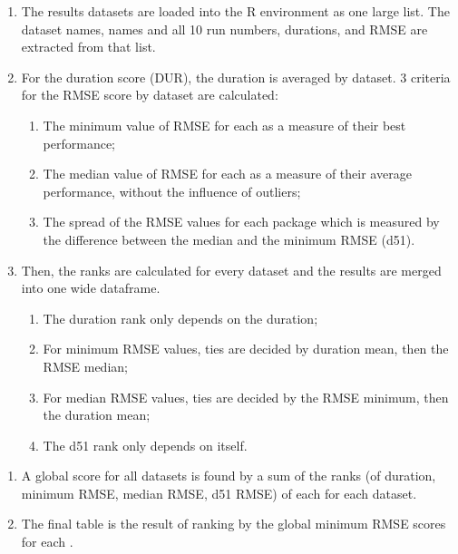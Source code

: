 \begin{enumerate}
\def\labelenumi{\arabic{enumi}.}
\tightlist
\item
  The results datasets are loaded into the \textsf{R} environment as one
  large list. The dataset names,  names and all
  10 run numbers, durations, and RMSE are extracted from that list.
\item
  For the duration score (DUR), the duration is averaged by dataset. 3
  criteria for the RMSE score by dataset are calculated:

  \begin{enumerate}
  \def\labelenumii{\alph{enumii}.}
  \tightlist
  \item
    The minimum value of RMSE for each  as a
    measure of their best performance;
  \item
    The median value of RMSE for each  as a
    measure of their average performance, without the influence of
    outliers;
  \item
    The spread of the RMSE values for each package which is measured by
    the difference between the median and the minimum RMSE (d51).
  \end{enumerate}
\item
  Then, the ranks are calculated for every dataset and the results are
  merged into one wide dataframe.

  \begin{enumerate}
  \def\labelenumii{\alph{enumii}.}
  \tightlist
  \item
    The duration rank only depends on the duration;
  \item
    For minimum RMSE values, ties are decided by duration mean, then the
    RMSE median;
  \item
    For median RMSE values, ties are decided by the RMSE minimum, then
    the duration mean;
  \item
    The d51 rank only depends on itself.
  \end{enumerate}
\end{enumerate}

\begin{enumerate}
\def\labelenumi{\arabic{enumi}.}
\setcounter{enumi}{3}
\tightlist
\item
  A global score for all datasets is found by a sum of the ranks (of
  duration, minimum RMSE, median RMSE, d51 RMSE) of each
   for each dataset.
\item
  The final table is the result of ranking by the global minimum RMSE
  scores for each .
\end{enumerate}

